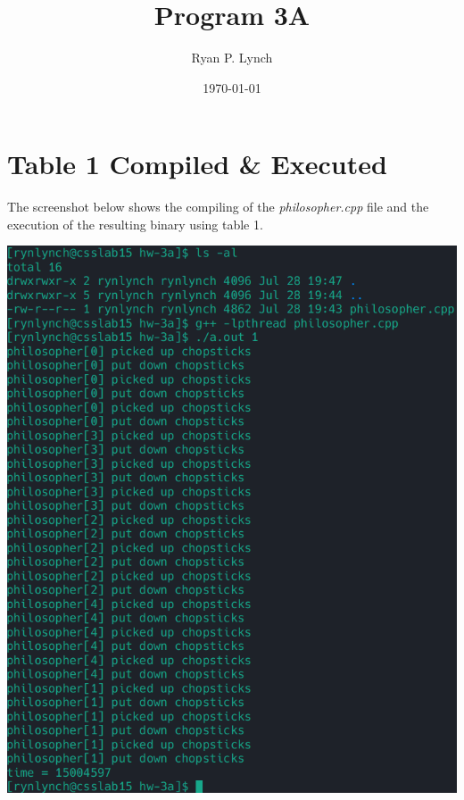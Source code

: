 \documentclass[a4paper,11pt,twoside]{article}
\author{Ryan P. Lynch}
\date{\today}
\title{Program 3A}
\begin{document}
\maketitle
\section*{Table 1 Compiled \& Executed}
\label{sec:org76dfbff}
The screenshot below shows the compiling of the \emph{philosopher.cpp} file and the execution of the resulting binary using table 1.
\begin{center}
\includegraphics[width=.9\linewidth]{./images/table1.png}
\end{center}
\end{document}
